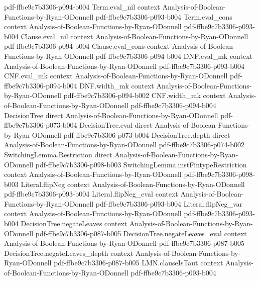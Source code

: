 \begin{theorem}
  {pdf-ffbe9c7b3306-p094-b004}
\proofstep
  {Term.eval_nil}
  {context}
  {Analysis-of-Boolean-Functions-by-Ryan-ODonnell}
  {pdf-ffbe9c7b3306-p093-b004}
\proofstep
  {Term.eval_cons}
  {context}
  {Analysis-of-Boolean-Functions-by-Ryan-ODonnell}
  {pdf-ffbe9c7b3306-p093-b004}
\proofstep
  {Clause.eval_nil}
  {context}
  {Analysis-of-Boolean-Functions-by-Ryan-ODonnell}
  {pdf-ffbe9c7b3306-p094-b004}
\proofstep
  {Clause.eval_cons}
  {context}
  {Analysis-of-Boolean-Functions-by-Ryan-ODonnell}
  {pdf-ffbe9c7b3306-p094-b004}
\proofstep
  {DNF.eval_mk}
  {context}
  {Analysis-of-Boolean-Functions-by-Ryan-ODonnell}
  {pdf-ffbe9c7b3306-p093-b004}
\proofstep
  {CNF.eval_mk}
  {context}
  {Analysis-of-Boolean-Functions-by-Ryan-ODonnell}
  {pdf-ffbe9c7b3306-p094-b004}
\proofstep
  {DNF.width_mk}
  {context}
  {Analysis-of-Boolean-Functions-by-Ryan-ODonnell}
  {pdf-ffbe9c7b3306-p094-b002}
\proofstep
  {CNF.width_mk}
  {context}
  {Analysis-of-Boolean-Functions-by-Ryan-ODonnell}
  {pdf-ffbe9c7b3306-p094-b004}
\proofstep
  {DecisionTree}
  {direct}
  {Analysis-of-Boolean-Functions-by-Ryan-ODonnell}
  {pdf-ffbe9c7b3306-p073-b004}
\proofstep
  {DecisionTree.eval}
  {direct}
  {Analysis-of-Boolean-Functions-by-Ryan-ODonnell}
  {pdf-ffbe9c7b3306-p073-b004}
\proofstep
  {DecisionTree.depth}
  {direct}
  {Analysis-of-Boolean-Functions-by-Ryan-ODonnell}
  {pdf-ffbe9c7b3306-p074-b002}
\proofstep
  {SwitchingLemma.Restriction}
  {direct}
  {Analysis-of-Boolean-Functions-by-Ryan-ODonnell}
  {pdf-ffbe9c7b3306-p098-b003}
\proofstep
  {SwitchingLemma.instFintypeRestriction}
  {context}
  {Analysis-of-Boolean-Functions-by-Ryan-ODonnell}
  {pdf-ffbe9c7b3306-p098-b003}
\proofstep
  {Literal.flipNeg}
  {context}
  {Analysis-of-Boolean-Functions-by-Ryan-ODonnell}
  {pdf-ffbe9c7b3306-p093-b004}
\proofstep
  {Literal.flipNeg_eval}
  {context}
  {Analysis-of-Boolean-Functions-by-Ryan-ODonnell}
  {pdf-ffbe9c7b3306-p093-b004}
\proofstep
  {Literal.flipNeg_var}
  {context}
  {Analysis-of-Boolean-Functions-by-Ryan-ODonnell}
  {pdf-ffbe9c7b3306-p093-b004}
\proofstep
  {DecisionTree.negateLeaves}
  {context}
  {Analysis-of-Boolean-Functions-by-Ryan-ODonnell}
  {pdf-ffbe9c7b3306-p087-b005}
\proofstep
  {DecisionTree.negateLeaves_eval}
  {context}
  {Analysis-of-Boolean-Functions-by-Ryan-ODonnell}
  {pdf-ffbe9c7b3306-p087-b005}
\proofstep
  {DecisionTree.negateLeaves_depth}
  {context}
  {Analysis-of-Boolean-Functions-by-Ryan-ODonnell}
  {pdf-ffbe9c7b3306-p087-b005}
\proofstep
  {LMN.clauseIsTaut}
  {context}
  {Analysis-of-Boolean-Functions-by-Ryan-ODonnell}
  {pdf-ffbe9c7b3306-p093-b004}
\proofstep

\end{theorem}
